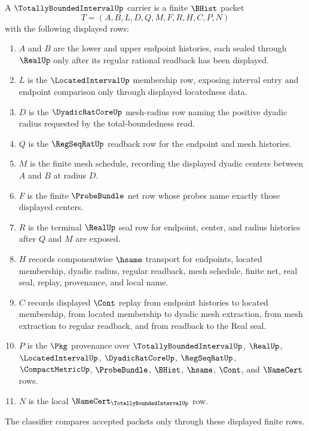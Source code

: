 \begin{definition}
\label{def:totally-bounded-interval-carrier}
A $\TotallyBoundedIntervalUp$ carrier is a finite $\BHist$ packet
$$
T=(A,B,L,D,Q,M,F,R,H,C,P,N)
$$
with the following displayed rows:
\begin{enumerate}
\item $A$ and $B$ are the lower and upper endpoint histories, each sealed through $\RealUp$ only after its regular rational readback has been displayed.
\item $L$ is the $\LocatedIntervalUp$ membership row, exposing interval entry and endpoint comparison only through displayed locatedness data.
\item $D$ is the $\DyadicRatCoreUp$ mesh-radius row naming the positive dyadic radius requested by the total-boundedness read.
\item $Q$ is the $\RegSeqRatUp$ readback row for the endpoint and mesh histories.
\item $M$ is the finite mesh schedule, recording the displayed dyadic centers between $A$ and $B$ at radius $D$.
\item $F$ is the finite $\ProbeBundle$ net row whose probes name exactly those displayed centers.
\item $R$ is the terminal $\RealUp$ seal row for endpoint, center, and radius histories after $Q$ and $M$ are exposed.
\item $H$ records componentwise $\hsame$ transport for endpoints, located membership, dyadic radius, regular readback, mesh schedule, finite net, real seal, replay, provenance, and local name.
\item $C$ records displayed $\Cont$ replay from endpoint histories to located membership, from located membership to dyadic mesh extraction, from mesh extraction to regular readback, and from readback to the Real seal.
\item $P$ is the $\Pkg$ provenance over $\TotallyBoundedIntervalUp$, $\RealUp$, $\LocatedIntervalUp$, $\DyadicRatCoreUp$, $\RegSeqRatUp$, $\CompactMetricUp$, $\ProbeBundle$, $\BHist$, $\hsame$, $\Cont$, and $\NameCert$ rows.
\item $N$ is the local $\NameCert_{\TotallyBoundedIntervalUp}$ row.
\end{enumerate}
The classifier compares accepted packets only through these displayed finite rows.
\end{definition}

